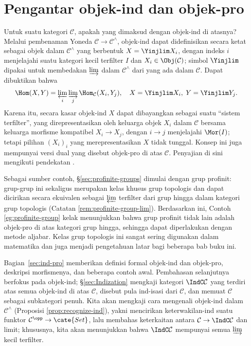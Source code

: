 

\chapter{Pengantar objek-ind dan objek-pro}\label{sec:app-Ind}
Untuk suatu kategori $\mathcal{C}$, apakah yang dimaksud dengan objek-ind di atasnya? Melalui pembenaman Yoneda $\mathcal{C} \to \mathcal{C}^{\wedge}$, objek-ind dapat didefinisikan secara ketat sebagai objek dalam $\mathcal{C}^\wedge$ yang berbentuk $X = \Yinjlim X_i$, dengan indeks $i$ menjelajahi suatu kategori kecil terfilter $I$ dan $X_i \in \Obj(\mathcal{C})$; simbol $\Yinjlim$ dipakai untuk membedakan $\varinjlim$ dalam $\mathcal{C}^{\wedge}$ dari yang ada dalam $\mathcal{C}$. Dapat dibuktikan bahwa
\[ \Hom(X, Y) = \varprojlim_i \varinjlim_j \Hom_{\mathcal{C}}(X_i, Y_j), \quad X = \Yinjlim X_i, \; Y = \Yinjlim Y_j. \]
Karena itu, secara kasar objek-ind $X$ dapat dibayangkan sebagai suatu ``sistem terfilter'', yang direpresentasikan oleh keluarga objek $X_i$ dalam $\mathcal{C}$ bersama keluarga morfisme kompatibel $X_i \to X_j$, dengan $i \to j$ menjelajahi $\Mor(I)$; tetapi pilihan $(X_i)_i$ yang merepresentasikan $X$ tidak tunggal. Konsep ini juga mempunyai versi dual yang disebut objek-pro di atas $\mathcal{C}$. Penyajian di sini mengikuti pendekatan \cite{KS06}.

Sebagai sumber contoh, \S\ref{sec:profinite-groups} dimulai dengan grup profinit: grup-grup ini sekaligus merupakan kelas khusus grup topologis dan dapat dicirikan secara ekuivalen sebagai $\varprojlim$ terfilter dari grup hingga dalam kategori grup topologis (Catatan \ref{rem:profinite-group-lim}). Berdasarkan ini, Contoh \ref{eg:profinite-group} kelak menunjukkan bahwa grup profinit tidak lain adalah objek-pro di atas kategori grup hingga, sehingga dapat diperlakukan dengan metode aljabar. Kelas grup topologis ini sangat sering digunakan dalam matematika dan juga menjadi pengetahuan latar bagi beberapa bab buku ini.

Bagian~\ref{sec:ind-pro} memberikan definisi formal objek-ind dan objek-pro,
deskripsi morfismenya, dan beberapa contoh awal. Pembahasan selanjutnya
berfokus pada objek-ind; \S\ref{sec:Indization} mengkaji kategori
$\IndC\mathcal{C}$ yang terdiri atas semua objek-ind di atas $\mathcal{C}$,
disebut pula ind-isasi dari $\mathcal{C}$, dan memuat $\mathcal{C}$ sebagai
subkategori penuh. Kita akan mengkaji cara mengenali objek-ind dalam
$\mathcal{C}^{\wedge}$ (Proposisi \ref{prop:recognize-ind}), yakni mencirikan
keterwakilan-ind suatu funktor $\mathcal{C}^{\opp} \to \cate{Set}$, lalu
membahas keterkaitan antara $\mathcal{C} \to \IndC\mathcal{C}$ dan limit;
khususnya, kita akan menunjukkan bahwa $\IndC\mathcal{C}$ mempunyai semua
$\varinjlim$ kecil terfilter.

